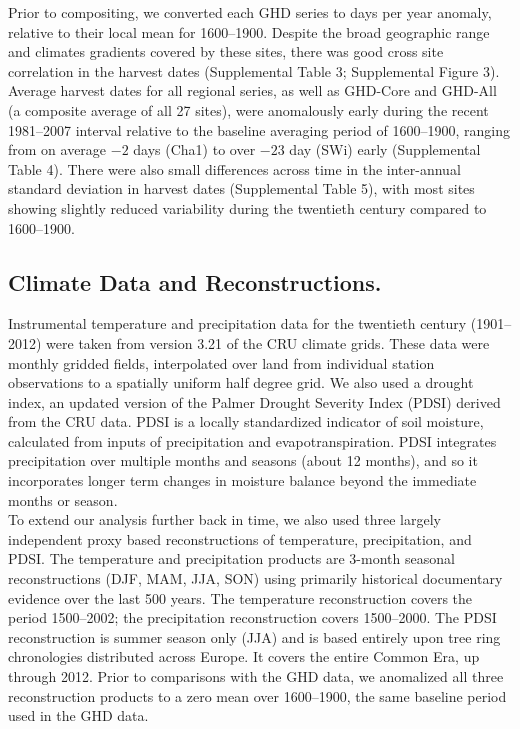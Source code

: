 \documentclass[final]{nature}
\begin{document}
\begin{methods}
\indent Prior to compositing, we converted each GHD series to days per year anomaly, relative to their local mean for 1600--1900. Despite the broad geographic range and climates gradients covered by these sites, there was good cross site correlation in the harvest dates (Supplemental Table 3; Supplemental Figure 3).  Average harvest dates for all regional series, as well as GHD-Core and GHD-All (a composite average of all 27 sites), were anomalously early during the recent 1981--2007 interval relative to the baseline averaging period of 1600--1900, ranging from on average $-2$ days (Cha1) to over $-23$ day (SWi) early (Supplemental Table 4). There were also small differences across time in the inter-annual standard deviation in harvest dates (Supplemental Table 5), with most sites showing slightly reduced variability during the twentieth century compared to 1600--1900.

\subsection{Climate Data and Reconstructions.}
\noindent Instrumental temperature and precipitation data for the twentieth century (1901--2012) were taken from version 3.21 of the CRU climate grids\cite{Harris2014}. These data were monthly gridded fields, interpolated over land from individual station observations to a spatially uniform half degree grid. We also used a drought index, an updated version of the Palmer Drought Severity Index (PDSI\cite{Palmer:1965}) derived from the CRU data\cite{Schrier2013}. PDSI is a locally standardized indicator of soil moisture, calculated from inputs of precipitation and evapotranspiration. PDSI integrates precipitation over multiple months and seasons (about 12 months), and so it incorporates longer term changes in moisture balance beyond the immediate months or season.\\
\indent To extend our analysis further back in time, we also used three largely independent proxy based reconstructions of temperature\cite{Luterbacher2004}, precipitation\cite{Pauling2006}, and PDSI\cite{CookOWDA2015}. The temperature and precipitation products are 3-month seasonal reconstructions (DJF, MAM, JJA, SON) using primarily historical documentary evidence over the last 500 years. The temperature reconstruction covers the period 1500--2002; the precipitation reconstruction covers 1500--2000. The PDSI reconstruction is summer season only (JJA) and is based entirely upon tree ring chronologies distributed across Europe. It covers the entire Common Era, up through 2012. Prior to comparisons with the GHD data, we anomalized all three reconstruction products to a zero mean over 1600--1900, the same baseline period used in the GHD data.


\end{methods}
\end{document}
